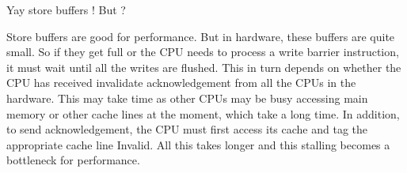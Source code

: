 \documentclass[notes, xcolor = dvipsnames]{beamer}
\begin{document}

    \begin{frame}{Yay store buffers ! But ? }
        
        Store buffers are good for performance. 
        But in hardware, these buffers are quite small. 
        So if they get full or the CPU needs to process a write barrier instruction, it must wait until all the writes are flushed.
        This in turn depends on whether the CPU has received invalidate acknowledgement from all the CPUs in the hardware. 
        This may take time as other CPUs may be busy accessing main memory or other cache lines at the moment, which take a long time. 
        In addition, to send acknowledgement, the CPU must first access its cache and tag the appropriate cache line Invalid. 
        All this takes longer and this stalling becomes a bottleneck for performance. 

    \end{frame}
\end{document}
